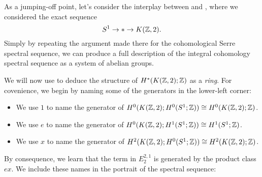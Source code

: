\begin{example}\label{CohomCPinftySSeq}%
As a jumping-off point, let's consider the interplay between  and , where we considered the exact sequence \[S^1 \to * \to K(\mathbb Z, 2).\]
Simply by repeating the argument made there for the cohomological Serre spectral sequence, we can produce a full description of the integral cohomology spectral sequence as a system of abelian groups.

We will now use  to deduce the structure of $H^*(K(\mathbb Z, 2); \mathbb Z)$ as a \emph{ring}.
For covenience, we begin by naming some of the generators in the lower-left corner:
\begin{itemize}
    \item We use $1$ to name the generator of $H^0(K(\mathbb Z, 2); H^0(S^1; \mathbb Z)) \cong H^0(K(\mathbb Z, 2); \mathbb Z)$.
    \item We use $e$ to name the generator of $H^0(K(\mathbb Z, 2); H^1(S^1; \mathbb Z)) \cong H^1(S^1; \mathbb Z)$.
    \item We use $x$ to name the generator of $H^2(K(\mathbb Z, 2); H^0(S^1; \mathbb Z)) \cong H^2(K(\mathbb Z, 2); \mathbb Z)$.
\end{itemize}
By consequence, we learn that the term in $E_2^{2, 1}$ is generated by the product class $ex$.
We include these names in the portrait of the spectral sequence:


\end{example}
